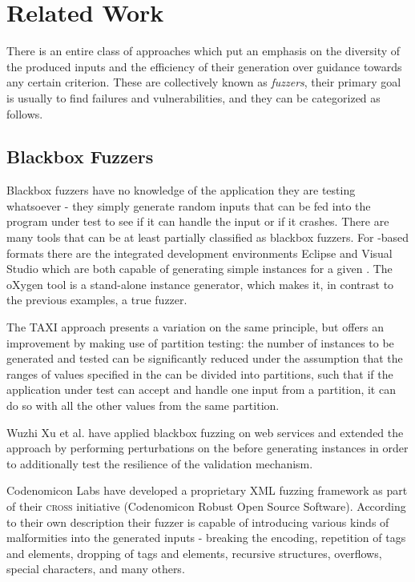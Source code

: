 \section{Related Work}
\label{sec:relwork}
There is an entire class of approaches which put an emphasis on the diversity of the produced inputs and the
efficiency of their generation over guidance towards any certain criterion. These are collectively known as
\emph{fuzzers}, their primary goal is usually to find failures and vulnerabilities, and they can be categorized
as follows.
\subsection{Blackbox Fuzzers}
Blackbox fuzzers have no knowledge of the application they are testing whatsoever - they simply generate random
inputs that can be fed into the program under test to see if it can handle the input or if it crashes.
There are many tools that can be at least partially classified as blackbox fuzzers. For \xml-based formats
there are the integrated development environments Eclipse\cite{eclipse} and Visual Studio\cite{visual} which
are both capable of generating simple instances for a given \xsd. The oXygen\cite{oxygen} tool is a stand-alone
\xml instance generator, which makes it, in contrast to the previous examples, a true fuzzer.
 		 
The TAXI\cite{Bertolino:2007:ATD:1270230.1270257} approach presents a variation on the same principle, but
offers an improvement by making use of partition testing: the number of instances to be generated
and tested can be significantly reduced under the assumption that the ranges of values specified in the \xsd
can be divided into partitions, such that if the application under test can accept and handle one input from a
partition, it can do so with all the other values from the same partition.

Wuzhi Xu et al.\cite{1544740} have applied blackbox fuzzing on web services and extended the approach by
performing perturbations on the \xsd before generating instances in order to additionally test the resilience
of the validation mechanism.

Codenomicon Labs have developed a proprietary XML fuzzing framework\cite{codenomicon} as part of their
\textsc{cross} initiative (Codenomicon Robust Open Source Software). According to their own description their
fuzzer is capable of introducing various kinds of malformities into the generated inputs - breaking the
encoding, repetition of tags and elements, dropping of tags and elements, recursive structures, overflows,
special characters, and many others.

